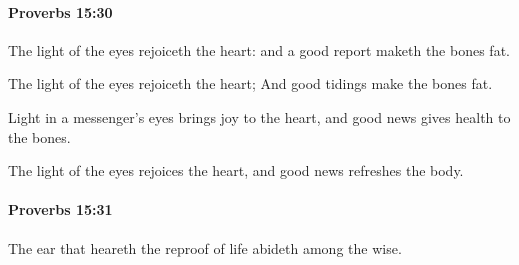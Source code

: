 		\paragraph{Proverbs 15:30} %
			\label{PROVERBS-15-30}

			The light of the eyes rejoiceth the heart: and a good report maketh the bones fat.

			\begin{versebox}
					\item[BHS] 
					\item[ASV] The light of the eyes rejoiceth the heart; And good tidings make the bones fat.
					\item[NIV] Light in a messenger’s eyes brings joy to the heart, and good news gives health to the bones.
					\item[NRSV] The light of the eyes rejoices the heart, and good news refreshes the body.
			\end{versebox}

		\paragraph{Proverbs 15:31} %
			\label{PROVERBS-15-31}

			The ear that heareth the reproof of life abideth among the wise.

